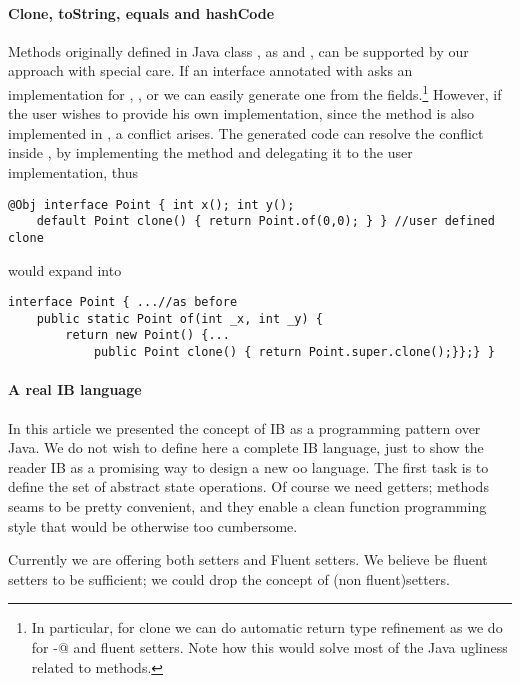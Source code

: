 \paragraph{Clone, toString, equals and hashCode}
Methods originally defined in Java class \Q@Object@, as \Q@clone@ and
\Q@toString@, can be supported by our approach with special care. If an
interface annotated with \mixin asks an implementation for \Q@clone@,
\Q@toString@, \Q@equals@ or \Q@hashCode@ we can easily generate one from the
fields.\footnote{In particular, for clone we can do automatic return type
  refinement as we do for \Q@with-@ and fluent setters. Note how this would
  solve most of the Java ugliness related to \Q@clone@ methods.}  However, if
the user wishes to provide his own implementation, since the method is also
implemented in \Q@Object@, a conflict arises. The generated code can resolve the
conflict inside \Q@of@, by implementing the method and delegating it to the user
implementation, thus

\begin{lstlisting}
@Obj interface Point { int x(); int y();
    default Point clone() { return Point.of(0,0); } } //user defined clone
\end{lstlisting} 
would expand into 

\begin{lstlisting}
interface Point { ...//as before
    public static Point of(int _x, int _y) {
        return new Point() {...
            public Point clone() { return Point.super.clone();}};} }
\end{lstlisting} 

\paragraph{A real IB language}
In this article we presented the concept of IB as a programming pattern over Java.
We do not wish to define here a complete IB language, just to show the reader IB as
a promising way to design a new oo language.
The first task is to define the set of abstract state operations.
Of course we need getters; \Q@withX@ methods seams to be pretty convenient, and they enable a
clean function programming style that would be otherwise too cumbersome.

Currently we are offering both setters and Fluent setters.
We believe be fluent setters to be sufficient; we could drop the concept of (non fluent)setters.

